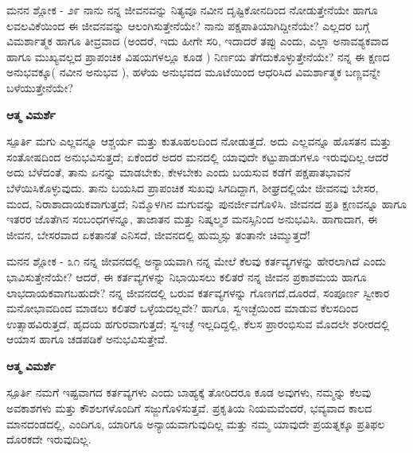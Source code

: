 \begin{mananam}{\mananamfont \large ಮನನ ಶ್ಲೋಕ - ೨೯}
\footnotesize \mananamtext ನಾನು ನನ್ನ ಜೀವನವನ್ನು ನಿತ್ಯವೂ ನವೀನ ದೃಷ್ಟಿಕೋನದಿಂದ ನೋಡುತ್ತೇನೆಯೇ ಹಾಗೂ ಲವಲವಿಕೆಯಿಂದ ಈ ಜೀವನವನ್ನು ಆಲಂಗಿಸುತ್ತೇನೆಯೇ? ನಾನು ಪಕ್ಷಪಾತಿಯಾಗಿದ್ದೀನೆಯೇ? ಎಲ್ಲದರ ಬಗ್ಗೆ ವಿಮರ್ಶಾತ್ಮಕ ಹಾಗೂ ತೀವ್ರವಾದ (ಅಂದರೆ, ಇದು ಹೀಗೇ ಸರಿ, ಇದಾದರೆ ತಪ್ಪು ಎಂದು, ಎಲ್ಲಾ ಅನಾವಶ್ಯಕವಾದ ಹಾಗೂ ಮುಖ್ಯವಲ್ಲದ ಪ್ರಾಪಂಚಿಕ ವಿಷಯಗಳಲ್ಲೂ ಕೂಡ ) ನಿರ್ಣಯ ತೆಗೆದುಕೊಳ್ಳುತ್ತೇನೆಯೇ? ನನ್ನ ಈ ಕ್ಷಣದ ಅನುಭವಕ್ಕೂ( ನವೀನ ಅನುಭವ ), ಹಳೆಯ  ಅನುಭವದ ಮೂಟೆಯಿಂದ ಆಧರಿಸಿದ ವಿಮರ್ಶಾತ್ಮಕ ಬಣ್ಣವನ್ನೇ ಬಳೆಯುತ್ತೇನೆಯೇ?
\end{mananam}
\WritingHand\enspace\textbf{ಆತ್ಮ ವಿಮರ್ಶೆ}
\begin{inspiration}{\mananamfont \large ಸ್ಪೂರ್ತಿ}
\ssmall \mananamtext ಮಗು ಎಲ್ಲವನ್ನೂ ಆಶ್ಚರ್ಯ ಮತ್ತು ಕುತೂಹಲದಿಂದ ನೋಡುತ್ತದೆ. ಅದು ಎಲ್ಲವನ್ನೂ ಹೊಸತನ ಮತ್ತು ಸಂತೋಷದಿಂದ ಅನುಭವಿಸುತ್ತದೆ; ಏಕೆಂದರೆ ಅದರ ಮನದಲ್ಲಿ ಯಾವುದೇ ಕಟ್ಟುಪಾಡುಗಳೂ ಇರುವುದಿಲ್ಲ.ಆದರೆ ಅದು ಬೆಳೆದಂತೆ, ತಾನು ಏನನ್ನು ಮಾಡಬೇಕು, ಕೇಳಬೇಕು ಎಂದು ಬಯಸುವ ಕಡೆಗೆ ಪಕ್ಷಪಾತಭಾವನೆ ಬೆಳೆಯಿಸಿಕೊಳ್ಳುವುದು. ತಾನು ಬಯಸಿದ ಪ್ರಾಪಂಚಿಕ ಸುಖವು ಸಿಗದಿದ್ದಾಗ,  ಶೀಘ್ರದಲ್ಲಿಯೇ ಜೀವನವು ಬೇಸರ, ಮಂದ, ನಿರಾಶಾದಾಯಕವಾಗುತ್ತದೆ; ನಿಮ್ಮೊಳಗಿನ ಮಗುವನ್ನು ಪುನರ್ಜೀವಗೊಳಿಸಿ. ಜೀವನದ ಪ್ರತಿ ಕ್ಷಣವನ್ನೂ ಹಾಗೂ ಇತರರ ಜೊತೆಗಿನ ಸಂಬಂಧಗಳನ್ನೂ, ತಾಜಾತನ ಮತ್ತು ನಿಷ್ಕಲ್ಮಶ ಮನಸ್ಸಿನಿಂದ ಅನುಭವಿಸಿ. ಹಾಗಾದಾಗ, ಈ ಜೀವನ, ಬೇಸರವಾದ ಏಕತಾನತೆ ಎನಿಸದೆ, ಜೀವನದಲ್ಲಿ ಹುಮ್ಮಸ್ಸು ತಂತಾನೇ ಚಿಮ್ಮುತ್ತದೆ!
\end{inspiration}
\newpage

\begin{mananam}{\mananamfont \large ಮನನ ಶ್ಲೋಕ - ೩೧}
\footnotesize \mananamtext ನನ್ನ ಜೀವನದಲ್ಲಿ ಅನ್ಯಾಯವಾಗಿ ನನ್ನ ಮೇಲೆ ಕೆಲವು ಕರ್ತವ್ಯಗಳನ್ನು ಹೇರಲಾಗಿದೆ ಎಂದು ಭಾವಿಸುತ್ತೇನೆಯೇ? ಆದರೆ, ಈ ಕರ್ತವ್ಯಗಳನ್ನು ನಿಭಾಯಿಸಲು ಕಲಿತರೆ ನನ್ನ ಜೀವನ ಪ್ರಕಾಶಮಯ ಹಾಗೂ ಲಾಭದಾಯಕವಾಗಬಹುದೇ? ನನ್ನ ಜೀವನದಲ್ಲಿ ಬರುವ ಕರ್ತವ್ಯಗಳನ್ನು ಗೊಣಗದೆ,ದೂರದೆ, ಸಂಪೂರ್ಣ ಸ್ವೀಕಾರ ಮನೋಭಾವದಿಂದ ಮಾಡಲು ಕಲಿತರೆ ಒಳ್ಳೆಯದಲ್ಲವೇ? ಹಾಗೂ, ಸ್ವಇಚ್ಛೆಯಿಂದ ಮಾಡುವ ಕೆಲಸದಿಂದ ಉತ್ಸಾಹವಿರುತ್ತದೆ, ಹೃದಯ ಹಗುರವಾಗುತ್ತದೆ; ಸ್ವಇಚ್ಛೆ ಇಲ್ಲದಿದ್ದಲ್ಲಿ, ಕೆಲಸ ಪ್ರಾರಂಭಿಸುವ  ಮೊದಲೇ ಶರೀರದಲ್ಲಿ ಆಯಾಸ ಹಾಗೂ ಚಡಪಡಿಕೆ ಅನುಭವಿಸುತ್ತೇವೆ. 
\end{mananam}
\WritingHand\enspace\textbf{ಆತ್ಮ ವಿಮರ್ಶೆ}
\begin{inspiration}{\mananamfont \large ಸ್ಪೂರ್ತಿ}
\footnotesize \mananamtext ನಮಗೆ ಇಷ್ಟವಾಗದ ಕರ್ತವ್ಯಗಳು ಎಂದು ಬಾಹ್ಯಕ್ಕೆ ತೋರಿದರೂ ಕೂಡ ಅವುಗಳು,  ನಮ್ಮನ್ನು ಕೆಲವು ಅವಕಾಶಗಳು ಮತ್ತು ಕೌಶಲಗಳೊಂದಿಗೆ ಸಜ್ಜುಗೊಳಿಸುತ್ತವೆ. ಪ್ರಕೃತಿಯ ನಿಯಮವೆಂದರೆ, ಭವ್ಯವಾದ ಕಾಲದ ಮಾನದಂಡದಲ್ಲಿ,  ಎಂದಿಗೂ, ಯಾರಿಗೂ ಅನ್ಯಾಯವಾಗುವುದಿಲ್ಲ ಮತ್ತು ನಮ್ಮ ಯಾವುದೇ ಪ್ರಯತ್ನಕ್ಕೂ ಪ್ರತಿಫಲ ದೊರಕದೇ ಇರುವುದಿಲ್ಲ.
\end{inspiration}
\newpage

